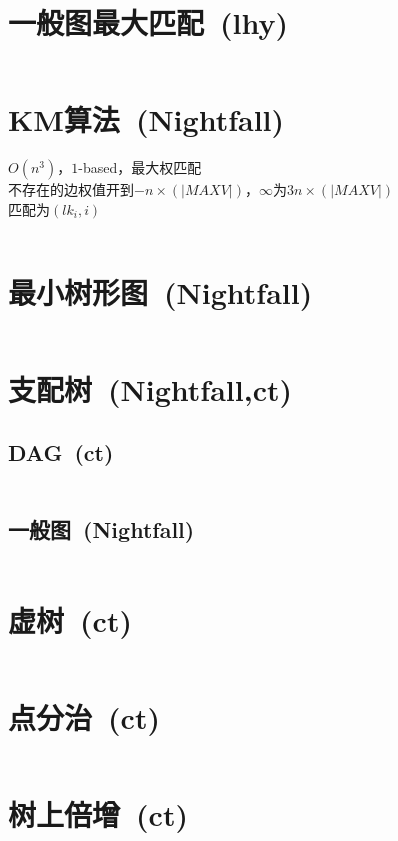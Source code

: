 \section{一般图最大匹配\ \small(lhy)}
	\inputminted{cpp}{graph_theory/blossom.cpp}
\section{KM算法\ \small(Nightfall)}
	$ O(n^3) $，$ 1 $-based，最大权匹配
	\\不存在的边权值开到$ -n \times (\left| MAXV \right|) $，$ \infty $为$ 3 n \times (\left| MAXV \right|) $
	\\匹配为$ (lk_i, i) $
	\inputminted{cpp}{graph_theory/km.cpp}
\section{最小树形图\ \small(Nightfall)}
	\inputminted{cpp}{graph_theory/zhu_liu.cpp}
\section{支配树\ \small(Nightfall,ct)}
	\subsection*{DAG\ \small(ct)}
		\inputminted{cpp}{graph_theory/dominator_tree_dag.cpp}
	\subsection*{一般图\ \small(Nightfall)}
		\inputminted{cpp}{graph_theory/dominator_tree.cpp}
\section{虚树\ \small(ct)}
	\inputminted{cpp}{graph_theory/virtual_tree.cpp}
\section{点分治\ \small(ct)}
	\inputminted{cpp}{graph_theory/divide_conquer_on_tree.cpp}
\section{树上倍增\ \small(ct)}
	\inputminted{cpp}{graph_theory/multiplier_on_tree.cpp}
